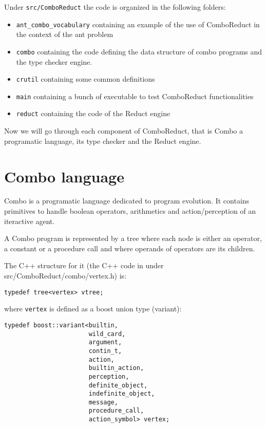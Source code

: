 \documentclass{article}
\begin{document}
  Under \verb|src/ComboReduct| the code is organized in the following
  folders:
  \begin{itemize}
  \item \verb|ant_combo_vocabulary| containing an example of the use of
    ComboReduct in the context of the ant problem
  \item \verb|combo| containing the code defining the data structure
    of combo programs and the type checker engine.
  \item \verb|crutil| containing some common definitions
  \item \verb|main| containing a bunch of executable to test ComboReduct
    functionalities
  \item \verb|reduct| containing the code of the Reduct engine
  \end{itemize}
    
  

  Now we will go through each component of ComboReduct, that is Combo a programatic language, its type checker and the Reduct engine.
    
  \section{Combo language}
  
  Combo is a programatic language dedicated to program evolution.
  It contains primitives to handle boolean operators, arithmetics and
  action/perception of an iteractive agent.
  
  A Combo program is represented by a tree where each node is either an
  operator,
  a constant or a procedure call and where operands of operators are
  its children.

  The C++ structure for it (the C++ code in under
  src/ComboReduct/combo/vertex.h)
  is:

  \begin{verbatim}
typedef tree<vertex> vtree;
  \end{verbatim}
  
  where \verb|vertex| is defined as a boost union type (variant):
  
  \begin{verbatim}
typedef boost::variant<builtin,
                       wild_card,
                       argument,
                       contin_t,
                       action,
                       builtin_action,
                       perception,
                       definite_object,
                       indefinite_object,
                       message,
                       procedure_call,
                       action_symbol> vertex;
  \end{verbatim}
\end{document}
